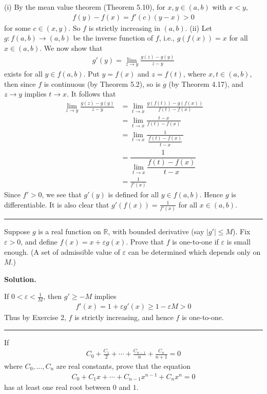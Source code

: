 \documentclass[12pt]{article}
\theoremstyle{definition}
\begin{document}
(i) By the mean value theorem (Theorem 5.10), for $x,y\in(a,b)$ with $x<y$,
\begin{align*}
f(y)-f(x)=f'(c)(y-x)>0
\end{align*}
for some $c\in(x,y)$. So $f$ is strictly increasing in $(a,b)$.
(ii) Let $g:f(a,b)\to(a,b)$ be the inverse function of $f$, i.e., $g(f(x))=x$ for all $x\in(a,b)$. We now show that
\begin{align*}
g'(y)=\lim_{z\to y}\frac{g(z)-g(y)}{z-y}
\end{align*}
exists for all $y\in f(a,b)$. Put $y=f(x)$ and $z=f(t)$, where $x,t\in(a,b)$, then since $f$ is continuous (by Theorem 5.2), so is $g$ (by Theorem 4.17), and $z\to y$ implies $t\to x$. It follows that
\begin{align*}
\lim_{z\to y}\frac{g(z)-g(y)}{z-y}
&=\lim_{t\to x}\frac{g(f(t))-g(f(x))}{f(t)-f(x)} \\
&=\lim_{t\to x}\frac{t-x}{f(t)-f(x)} \\
&=\lim_{t\to x}\frac{1}{\,\dfrac{f(t)-f(x)}{t-x}\,} \\
&=\dfrac{1}{\displaystyle\lim_{t\to x}\dfrac{f(t)-f(x)}{t-x}} \\
&=\frac{1}{f'(x)}
\end{align*}
Since $f'>0$, we see that $g'(y)$ is defined for all $y\in f(a,b)$. Hence $g$ is differentiable. It is also clear that $g'(f(x))=\frac{1}{f'(x)}$ for all $x\in(a,b)$.



\bigskip\noindent\hrule\bigskip

Suppose $g$ is a real function on $\mathbb{R}$, with bounded derivative (say $\left\vert g'\right\vert\le M$). Fix $\varepsilon>0$, and define $f(x)=x+\varepsilon g(x)$. Prove that $f$ is one-to-one if $\varepsilon$ is small enough. (A set of admissible value of $\varepsilon$ can be determined which depends only on $M$.)

\smallskip
\noindent\textbf{Solution.}\quad

If $0<\varepsilon<\frac{1}{M}$, then $g'\ge-M$ implies
\begin{align*}
f'(x)=1+\varepsilon g'(x)\ge 1-\varepsilon M>0
\end{align*}
Thus by Exercise 2, $f$ is strictly increasing, and hence $f$ is one-to-one.



\bigskip\noindent\hrule\bigskip

If
\begin{align*}
C_0+\frac{C_1}{2}+\cdots+\frac{C_{n-1}}{n}+\frac{C_n}{n+1}=0
\end{align*}
where $C_0,\ldots,C_n$ are real constants, prove that the equation
\begin{align*}
C_0+C_1x+\cdots+C_{n-1}x^{n-1}+C_nx^n=0
\end{align*}
has at least one real root between $0$ and $1$.
\end{document}
